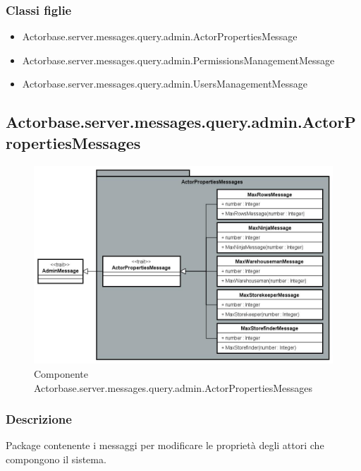 \documentclass[a4paper]{article}
\begin{document}
			\subsubsection{Classi figlie}
				\begin{itemize}
					\item Actorbase.server.messages.query.admin.ActorPropertiesMessage
					\item Actorbase.server.messages.query.admin.PermissionsManagementMessage
					\item Actorbase.server.messages.query.admin.UsersManagementMessage
				\end{itemize}
		
		\subsection{Actorbase.server.messages.query.admin.ActorPropertiesMessages}
		
			\begin{figure}[H]
				\centering
				\includegraphics[width=\textwidth]{ST/Server/actorPropertiesLevel.jpg}
				\caption{Componente Actorbase.server.messages.query.admin.ActorPropertiesMessages}
			\end{figure}
			
			\subsubsection{Descrizione}
				Package contenente i messaggi per modificare le proprietà degli attori che compongono il sistema.
				
\end{document}
